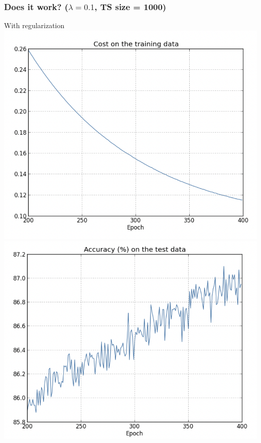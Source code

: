 \documentclass[usenames,dvipsnames]{beamer}
\begin{document}

\begin{frame}
  \frametitle{Does it work? ($\lambda = 0.1$, TS size = 1000)}
  
  \begin{minipage}{.4\textwidth}
  \begin{center}
  {\tiny With regularization}
  \includegraphics[scale=.29]{reg-cost}
  \includegraphics[scale=.29]{reg-accuracy}
  \end{center}
  \end{minipage} \hfill \pause \begin{minipage}{.4\textwidth}

\end{minipage}
\end{frame}
\end{document}

